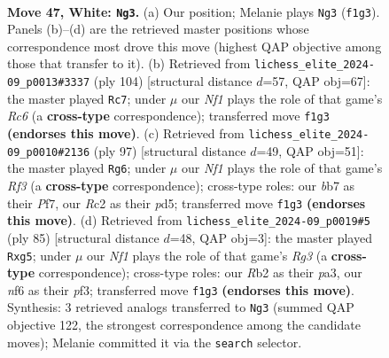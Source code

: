 \documentclass[11pt]{article}
\begin{document}
\clearpage

\begin{figure}[p]\centering
\begin{subfigure}{0.46\textwidth}\centering
\resizebox{\linewidth}{!}{%
\newchessgame
\chessboard[
  setfen={6k1/1b3p2/5np1/8/6qP/8/1RR4P/5NK1 w - - 1 47},
  showmover=false,
  pgfstyle=straightmove, color=movearrow, markmove={f1-g3}
]}
\caption{}
\end{subfigure}\hfill
\begin{subfigure}{0.46\textwidth}\centering
\resizebox{\linewidth}{!}{%
\newchessgame
\chessboard[
  setfen={8/1K2qpk1/1PR5/8/8/2R1p1P1/8/8 w - - 2 53},
  showmover=false,
  pgfstyle=straightmove, color=movearrow, markmove={c6-c7}
]}
\caption{}
\end{subfigure}
\\[4pt]
\begin{subfigure}{0.46\textwidth}\centering
\resizebox{\linewidth}{!}{%
\newchessgame
\chessboard[
  setfen={8/5pk1/3p1r2/3P4/8/6QP/4KP2/8 b - - 6 49},
  showmover=false,
  pgfstyle=straightmove, color=movearrow, markmove={f6-g6}
]}
\caption{}
\end{subfigure}\hfill
\begin{subfigure}{0.46\textwidth}\centering
\resizebox{\linewidth}{!}{%
\newchessgame
\chessboard[
  setfen={8/5kp1/p5r1/6Q1/5K2/P4P1P/6P1/8 b - - 2 43},
  showmover=false,
  pgfstyle=straightmove, color=movearrow, markmove={g6-g5}
]}
\caption{}
\end{subfigure}
\caption{\textbf{Move 47, White: \texttt{Ng3}.} (a) Our position; Melanie plays \texttt{Ng3} (\texttt{f1g3}). Panels (b)--(d) are the retrieved master positions whose correspondence most drove this move (highest QAP objective among those that transfer to it). (b) Retrieved from \texttt{lichess\_elite\_2024-09\_p0013\#3337} (ply 104) [structural distance $d$=57, QAP obj=67]: the master played \texttt{Rc7}; under $\mu$ our \emph{Nf1} plays the role of that game's \emph{Rc6} (a \textbf{cross-type} correspondence); transferred move \texttt{f1g3} \textbf{(endorses this move)}. (c) Retrieved from \texttt{lichess\_elite\_2024-09\_p0010\#2136} (ply 97) [structural distance $d$=49, QAP obj=51]: the master played \texttt{Rg6}; under $\mu$ our \emph{Nf1} plays the role of that game's \emph{Rf3} (a \textbf{cross-type} correspondence); cross-type roles: our \emph{b}b7 as their \emph{P}f7, our \emph{R}c2 as their \emph{p}d5; transferred move \texttt{f1g3} \textbf{(endorses this move)}. (d) Retrieved from \texttt{lichess\_elite\_2024-09\_p0019\#5} (ply 85) [structural distance $d$=48, QAP obj=3]: the master played \texttt{Rxg5}; under $\mu$ our \emph{Nf1} plays the role of that game's \emph{Rg3} (a \textbf{cross-type} correspondence); cross-type roles: our \emph{R}b2 as their \emph{p}a3, our \emph{n}f6 as their \emph{p}f3; transferred move \texttt{f1g3} \textbf{(endorses this move)}. Synthesis: 3 retrieved analogs transferred to \texttt{Ng3} (summed QAP objective 122, the strongest correspondence among the candidate moves); Melanie committed it via the \texttt{search} selector.}
\label{fig:thought-m92}
\end{figure}
\end{document}
